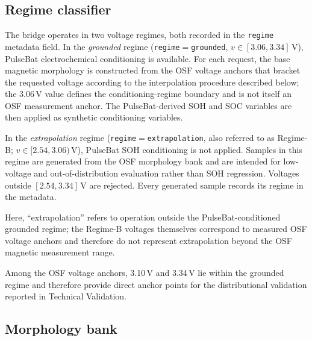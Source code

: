 \documentclass[11pt]{article}
\begin{document}
\subsection*{Regime classifier}

The bridge operates in two voltage regimes, both recorded in the
\texttt{regime} metadata field. In the \emph{grounded} regime
(\texttt{regime}${=}$\texttt{grounded},
$v \in [3.06,3.34]$\,V), PulseBat electrochemical conditioning is
available. For each request, the base magnetic morphology is constructed
from the OSF voltage anchors that bracket the requested voltage according
to the interpolation procedure described below; the 3.06\,V value defines
the conditioning-regime boundary and is not itself an OSF measurement
anchor. The PulseBat-derived SOH and SOC variables are then applied as
synthetic conditioning variables.

In the \emph{extrapolation} regime
(\texttt{regime}${=}$\texttt{extrapolation}, also referred to as
Regime-B; $v \in [2.54,3.06)$\,V), PulseBat SOH conditioning is not
applied. Samples in this regime are generated from the OSF morphology
bank and are intended for low-voltage and out-of-distribution evaluation
rather than SOH regression. Voltages outside $[2.54,3.34]$\,V are
rejected. Every generated sample records its regime in the metadata.

Here, ``extrapolation'' refers to operation outside the PulseBat-conditioned
grounded regime; the Regime-B voltages themselves correspond to measured OSF
voltage anchors and therefore do not represent extrapolation beyond the OSF
magnetic measurement range.

Among the OSF voltage anchors, 3.10\,V and 3.34\,V lie within the grounded
regime and therefore provide direct anchor points for the distributional
validation reported in Technical Validation.

\subsection*{Morphology bank}
\end{document}
